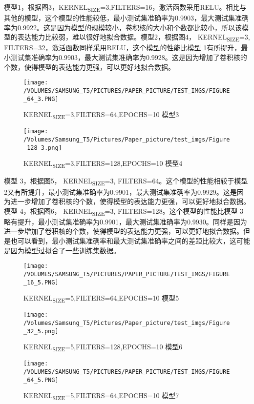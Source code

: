 \documentclass[11pt]{article}
\begin{document}
模型1，根据图3，KERNEL\textsubscript{SIZE}=3,FILTERS=16，激活函数采用RELU。相比与其他的模型，这个模型的性能较低，最小测试集准确率为0.9903，最大测试集准确率为0.9922。这是因为模型的规模较小，卷积核的大小和个数都比较小，所以该模型的表达能力比较弱，难以很好地拟合数据。模型2，根据图4， KERNEL\textsubscript{SIZE}=3, FILTERS=32，激活函数同样采用RELU，这个模型的性能比模型 1有所提升，最小测试集准确率为0.9903，最大测试集准确率为0.9928。这是因为增加了卷积核的个数，使得模型的表达能力更强，可以更好地拟合数据。
\begin{figure}[htbp]
\centering
\texttt{[image: /VOLUMES/SAMSUNG\_T5/PICTURES/PAPER\_PICTURE/TEST\_IMGS/FIGURE\_64\_3.PNG]}
\caption{KERNEL\textsubscript{SIZE}=3,FILTERS=64,EPOCHS=10 模型3}
\end{figure}
\begin{figure}[htbp]
\centering
\texttt{[image: /Volumes/Samsung\_T5/Pictures/Paper\_picture/test\_imgs/Figure\_128\_3.png]}
\caption{KERNEL\textsubscript{SIZE}=3,FILTERS=128,EPOCHS=10 模型4}
\end{figure}

模型 3，根据图5， KERNEL\textsubscript{SIZE}=3, FILTERS=64。这个模型的性能相较于模型 2又有所提升，最小测试集准确率为0.9901，最大测试集准确率为0.9929。这是因为进一步增加了卷积核的个数，使得模型的表达能力更强，可以更好地拟合数据。模型 4，根据图6， KERNEL\textsubscript{SIZE}=3, FILTERS=128。这个模型的性能比模型 3略有提升，最小测试集准确率为0.9901，最大测试集准确率为0.9930。同样是因为进一步增加了卷积核的个数，使得模型的表达能力更强，可以更好地拟合数据。但是也可以看到，最小测试集准确率和最大测试集准确率之间的差距比较大，这可能是因为模型过拟合了一些训练集数据。

\begin{figure}[htbp]
\centering
\texttt{[image: /VOLUMES/SAMSUNG\_T5/PICTURES/PAPER\_PICTURE/TEST\_IMGS/FIGURE\_16\_5.PNG]}
\caption{KERNEL\textsubscript{SIZE}=5,FILTERS=64,EPOCHS=10 模型5}
\end{figure}

\begin{figure}[htbp]
\centering
\texttt{[image: /Volumes/Samsung\_T5/Pictures/Paper\_picture/test\_imgs/Figure\_32\_5.png]}
\caption{KERNEL\textsubscript{SIZE}=5,FILTERS=128,EPOCHS=10 模型6}
\end{figure}
\begin{figure}[htbp]
\centering
\texttt{[image: /VOLUMES/SAMSUNG\_T5/PICTURES/PAPER\_PICTURE/TEST\_IMGS/FIGURE\_64\_5.PNG]}
\caption{KERNEL\textsubscript{SIZE}=5,FILTERS=64,EPOCHS=10 模型7}
\end{figure}
\end{document}

